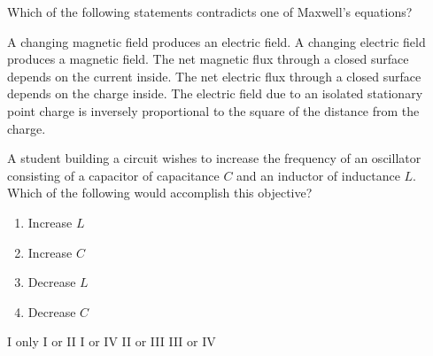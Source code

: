 \documentclass[12pt]{../oss-classkick-exam}
\begin{document}
\begin{questions}
  \uplevel{\rule{\linewidth}{.5pt}}
  
  \question Which of the following statements contradicts one of Maxwell's
  equations?
  \begin{choices}
    \choice A changing magnetic field produces an electric field.
    \choice A changing electric field produces a magnetic field.
    \choice The net magnetic flux through a closed surface depends on the
    current inside.
    \choice The net electric flux through a closed surface depends on the
    charge inside.
    \choice The electric field due to an isolated stationary point charge is
    inversely proportional to the square of the distance from the charge.
  \end{choices}
  \vspace{.7in}

  \uplevel{\rule{\linewidth}{.5pt}}
  
  \question A student building a circuit wishes to increase the frequency of an
  oscillator consisting of a capacitor of capacitance $C$ and an inductor of
  inductance $L$. Which of the following would accomplish this objective?
  \begin{enumerate}[nosep,label={\Roman*.}]
  \item Increase $L$
  \item Increase $C$
  \item Decrease $L$
  \item Decrease $C$
  \end{enumerate}
  \vspace{.2in}
  \begin{choices}
    \choice I only
    \choice I or II
    \choice I or IV
    \choice II or III
    \choice III or IV
  \end{choices}
\end{questions}
\end{document}
